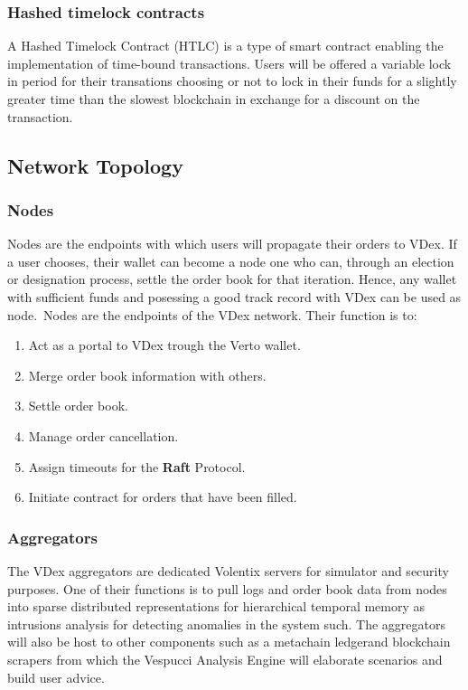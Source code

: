 \documentclass[]{article}
\begin{document}
	\subsubsection{Hashed timelock contracts}
	A Hashed Timelock Contract (HTLC)\cite{22} is a type of smart contract enabling the implementation of time-bound transactions.
	Users will be offered a variable lock in period for their transations choosing or not
	to lock in their funds for a slightly greater time than the slowest blockchain in exchange for a discount on the transaction.
	
	\subsection{Network Topology}
	\subsubsection{Nodes}
	Nodes are the endpoints with which users will propagate their orders to VDex. If a user chooses, their wallet can become a node one who can, through an election or designation process, settle the order book for that iteration.   
	Hence, any wallet with sufficient funds and posessing a good track record with VDex can be used as node.\
	Nodes are the endpoints of the VDex network.
	Their function is to:\
	\begin{enumerate}
		\item Act as a portal to VDex trough the Verto wallet.
		\item Merge order book information with others.
		\item Settle order book.\
		\item Manage order cancellation.\
		\item Assign timeouts for the \textbf{Raft} Protocol.\
		\item Initiate contract for orders that have been filled.
	\end{enumerate}
	
	\subsubsection{Aggregators}
	
	The VDex aggregators are dedicated Volentix servers for simulator and security purposes. 
	One of their functions is to pull logs and order book data from nodes into sparse distributed representations for hierarchical temporal memory as intrusions \cite{24} analysis for detecting anomalies in the system such. The aggregators will also be host to other components such as a metachain ledger\cite{20}and blockchain scrapers from which the Vespucci Analysis Engine will elaborate scenarios and build user advice.
	
\end{document}
